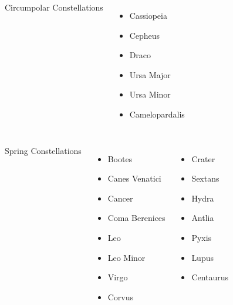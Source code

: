 \begin{frame}{\insertsubsubsectionhead}
  \begin{columns}[T,onlytextwidth]

    \centering

    {\Large Circumpolar Constellations}
      \begin{itemize}
        \item Cassiopeia
        \item Cepheus
        \item Draco
        \item Ursa Major
        \item Ursa Minor
        \item Camelopardalis
      \end{itemize}

  \end{columns}
\end{frame}


\begin{frame}{\insertsubsubsectionhead}
  \begin{columns}[T,onlytextwidth]

    \centering

    {\Large Spring Constellations}
    \begin{columns}[T,onlytextwidth]
      \begin{itemize}
        \item Bootes
        \item Canes Venatici
        \item Cancer
        \item Coma Berenices
        \item Leo
        \item Leo Minor
        \item Virgo
        \item Corvus
      \end{itemize}
      \begin{itemize}
        \item Crater
        \item Sextans
        \item Hydra
        \item Antlia
        \item Pyxis
        \item Lupus
        \item Centaurus
      \end{itemize}
    \end{columns}
  \end{columns}
\end{frame}

